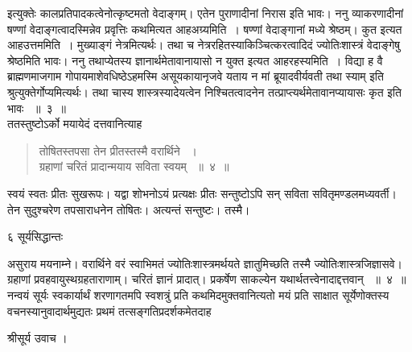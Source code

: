 \documentclass[11pt, openany]{book}
\begin{document}
\begin{sloppypar}
 इत्युक्तेः कालप्रतिपादकत्वेनोत्कृष्टमतो वेदाङ्गम्। एतेन पुराणादीनां निरास इति भावः। ननु व्याकरणादीनां षण्णां वेदाङ्गत्वादस्मिन्नेव प्रवृत्तिः कथमित्यत आह\textendash अग्र्यमिति~। षण्णां वेदाङ्गानां मध्ये श्रेष्ठम्। कुत इत्यत आह\textendash उत्तममिति~। मुख्याङ्गं नेत्रमित्यर्थः। तथा च नेत्ररहितस्याकिञ्चित्करत्वादिदं ज्योतिःशास्त्रं वेदाङ्गेषु श्रेष्ठमिति भावः। ननु तथाप्येतस्य ज्ञानार्थमेतावानायासो न युक्त इत्यत आह\textendash रहस्यमिति~। विद्या ह वै ब्राह्मणमाजगाम गोपायमाशेवधिष्ठेऽहमस्मि असूयकायानृजवे यताय न मां ब्रूयादवीर्यवती तथा स्याम् इति श्रुत्युक्तेर्गोप्यमित्यर्थः। तथा चास्य शास्त्रस्यादेयत्वेन निश्चितत्वादनेन तत्प्राप्त्यर्थमेतावानप्यायासः कृत इति भावः ~॥~३~॥\\ \noindent ततस्तुष्टोऽर्को मयायेदं दत्तवानित्याह\textendash
\end{sloppypar}


\begin{quote}
 {\ssi तोषितस्तपसा तेन प्रीतस्तस्मै वरार्थिने ~।\\
ग्रहाणां चरितं प्रादान्मयाय सविता स्वयम् ~॥~४~॥}
\end{quote}
 स्वयं स्वतः प्रीतः सुखरूपः। यद्वा शोभनोऽयं प्रत्यक्षः प्रीतः सन्तुष्टोऽपि सन् सविता सवितृमण्डलमध्यवर्ती। तेन सुदुश्चरेण तपसाराधनेन तोषितः। अत्यन्तं सन्तुष्टः। तस्मै।

\newpage


\noindent ६ \hspace{4cm} सूर्यसिद्धान्तः
 \vspace{1cm}
 
\noindent असुराय मयनाम्ने। वरार्थिने वरं स्वाभिमतं ज्योतिःशास्त्रमर्थयते ज्ञातुमिच्छति तस्मै ज्योतिःशास्त्रजिज्ञासवे। ग्रहाणां प्रवहवायुस्थग्रहताराणाम्। चरितं ज्ञानं प्रादात्। प्रकर्षेण साकल्येन यथार्थतत्त्वेनादाद्दत्तवान् ~॥~४~॥\\
\noindent नन्वयं सूर्यः स्वकार्यार्थं शरणागतमपि स्वशत्रुं प्रति कथमिदमुक्तवानित्यतो मयं प्रति साक्षात सूर्येणोक्तस्य वचनस्यानुवादार्थमुद्यतः प्रथमं तत्सङ्गतिप्रदर्शकमेतदाह\textendash

\begin{center}
 श्रीसूर्य उवाच ।
\end{center}
\end{document}
